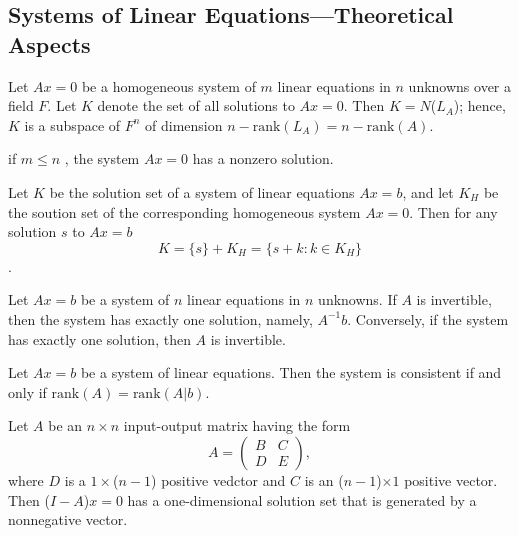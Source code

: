 \subsection{Systems of Linear Equations---Theoretical Aspects}
\begin{theorem}
    Let \( Ax = 0 \) be a homogeneous system of \( m \) linear equations in \( n \) unknowns over a field \( F \). Let \( K \) denote the set of all solutions to \( Ax = 0 \). Then \( K =  N\)(\(L_A\));
    hence, \( K \) is a subspace of \( F^n \) of dimension \( n - \text{rank}(L_A) = n - \text{rank}(A) \).
\end{theorem}
\vspace{3cm}
\begin{corollary}
    if \( m \leq n \) , the system \( Ax = 0 \) has a nonzero solution.
\end{corollary}
\vspace{3cm}
\begin{theorem}
    Let \( K \) be the solution set of a system of linear equations \( Ax = b \), and let \( K_H \) be the soution set of the corresponding homogeneous system \( Ax = 0 \).
    Then for any solution \( s \) to \( Ax = b \) \\
    \[ K = \{s\} + K_H = \{s+k: k \in K_H\} \].
\end{theorem}
\vspace{7cm}
\begin{theorem}
    Let \( Ax = b \) be a system of \( n \) linear equations in \( n \) unknowns. If \( A \) is invertible, then the system has exactly one solution, namely, \( A^{-1}b \).
    Conversely, if the system has exactly one solution, then \( A \) is invertible.
\end{theorem}
\vspace{7cm}
\begin{theorem}
    Let \( Ax = b \) be a system of linear equations. Then the system is consistent if and only if \(\text{rank}(A) = \text{rank}(A|b)\).
\end{theorem}
\vspace{5cm}
\begin{theorem}
    Let \( A \) be an \( n \times n \) input-output matrix having the form
    \[
    A = \begin{pmatrix}
        B & C \\
        D & E
        \end{pmatrix},
    \]
    where \( D \) is a \( 1 \times \)(\(n-1\)) positive vedctor and \( C \) is an (\(n-1\))\(\times 1\) positive vector. Then (\(I - A\))\(x = 0\) has a one-dimensional solution set that is generated by a nonnegative vector.
\end{theorem}
\newpage
